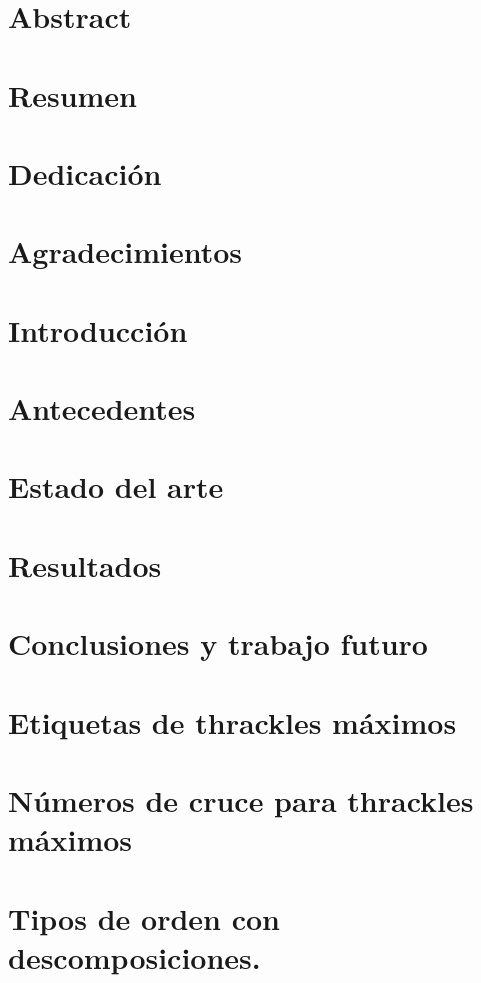 \documentclass[12pt]{book}
\theoremstyle{definition}
\begin{document}

\chapter*{Abstract}
\chapter*{Resumen}
\chapter*{Dedicación}

\chapter*{Agradecimientos}

\tableofcontents

\chapter{Introducción}

\chapter{Antecedentes}

\chapter{Estado del arte}
\label{cap3}
\chapter{Resultados}\label{cap4}

\chapter{Conclusiones y trabajo futuro}

\appendix
\chapter{Etiquetas de thrackles máximos}

\chapter{Números de cruce para thrackles máximos}

\chapter{Tipos de orden con descomposiciones.}



\end{document}
